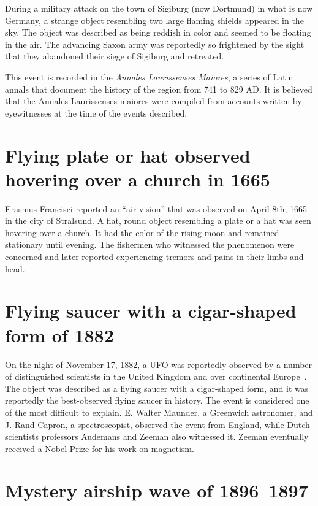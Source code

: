During a military attack on the town of Sigiburg (now Dortmund) in what is now Germany, a strange object resembling two large
flaming shields appeared in the sky. The object was described as being reddish in color and seemed to be floating in the air.
The advancing Saxon army was reportedly so frightened by the sight that they abandoned their siege of Sigiburg and retreated.

This event is recorded in the {\it Annales Laurissenses Maiores}, a series of Latin annals that document the history of the region from 741 to 829 AD. It is believed that the Annales Laurissenses maiores were compiled from accounts written by eyewitnesses at the time of the events described.

\section{Flying plate or hat observed hovering over a church in 1665}
\label{2023-UFO-part-History-chapter-pre-1945-fpohhoc1665}

Erasmus Francisci reported an ``air vision'' that was observed on April 8th, 1665~\cite{VonLudwiger1998Jan} in the city of Stralsund. A flat, round object resembling a plate or a hat was seen hovering over a church. It had the color of the rising moon and remained stationary until evening. The fishermen who witnessed the phenomenon were concerned and later reported experiencing tremors and pains in their limbs and head.

\section{Flying saucer with a cigar-shaped form of 1882}
\label{2023-UFO-part-History-chapter-pre-1945-fswcsf1882}

On the night of November 17, 1882, a UFO was reportedly observed by a number of distinguished scientists in the United Kingdom and over continental Europe~\cite[Chapter~7]{Menzel_1953}. The object was described as a flying saucer with a cigar-shaped form, and it was reportedly the best-observed flying saucer in history. The event is considered one of the most difficult to explain. E. Walter Maunder, a Greenwich astronomer, and J. Rand Capron, a spectroscopist, observed the event from England, while Dutch scientists professors Audemans and Zeeman also witnessed it. Zeeman eventually received a Nobel Prize for his work on magnetism.


\section{Mystery airship wave of 1896--1897}
\label{2023-UFO-part-History-chapter-pre-1945-masw18967}

